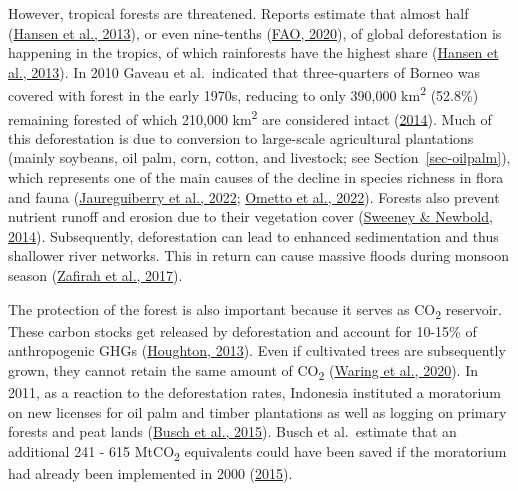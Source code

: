 \documentclass[
  letterpaper,
  DIV=11,
  numbers=noendperiod]{scrreprt}
\begin{document}
However, tropical forests are threatened. Reports estimate that almost
half (\protect\hyperlink{ref-hansenHighResolutionGlobalMaps2013}{Hansen
et al., 2013}), or even nine-tenths
(\protect\hyperlink{ref-faoGlobalForestResources2020}{FAO, 2020}), of
global deforestation is happening in the tropics, of which rainforests
have the highest share
(\protect\hyperlink{ref-hansenHighResolutionGlobalMaps2013}{Hansen et
al., 2013}). In 2010 Gaveau et al.~indicated that three-quarters of
Borneo was covered with forest in the early 1970s, reducing to only
390,000 km\textsuperscript{2} (52.8\%) remaining forested of which
210,000 km\textsuperscript{2} are considered intact
(\protect\hyperlink{ref-gaveauFourDecadesForest2014}{2014}). Much of
this deforestation is due to conversion to large-scale agricultural
plantations (mainly soybeans, oil palm, corn, cotton, and livestock; see
Section~\ref{sec-oilpalm}), which represents one of the main causes of
the decline in species richness in flora and fauna
(\protect\hyperlink{ref-jaureguiberryDirectDriversRecent2022}{Jaureguiberry
et al., 2022};
\protect\hyperlink{ref-omettoContributionWorkingGroup2022}{Ometto et
al., 2022}). Forests also prevent nutrient runoff and erosion due to
their vegetation cover
(\protect\hyperlink{ref-sweeneyStreamsideForestBuffer2014}{Sweeney \&
Newbold, 2014}). Subsequently, deforestation can lead to enhanced
sedimentation and thus shallower river networks. This in return can
cause massive floods during monsoon season
(\protect\hyperlink{ref-zafirahSustainableEcosystemServices2017}{Zafirah
et al., 2017}).

The protection of the forest is also important because it serves as
CO\textsubscript{2} reservoir. These carbon stocks get released by
deforestation and account for 10-15\% of anthropogenic GHGs
(\protect\hyperlink{ref-houghtonEmissionsCarbonDeforestation2013}{Houghton,
2013}). Even if cultivated trees are subsequently grown, they cannot
retain the same amount of CO\textsubscript{2}
(\protect\hyperlink{ref-waringForestsDecarbonizationRoles2020}{Waring et
al., 2020}). In 2011, as a reaction to the deforestation rates,
Indonesia instituted a moratorium on new licenses for oil palm and
timber plantations as well as logging on primary forests and peat lands
(\protect\hyperlink{ref-buschReductionsEmissionsDeforestation2015}{Busch
et al., 2015}). Busch et al.~estimate that an additional 241 - 615
MtCO\textsubscript{2} equivalents could have been saved if the
moratorium had already been implemented in 2000
(\protect\hyperlink{ref-buschReductionsEmissionsDeforestation2015}{2015}).
\end{document}
